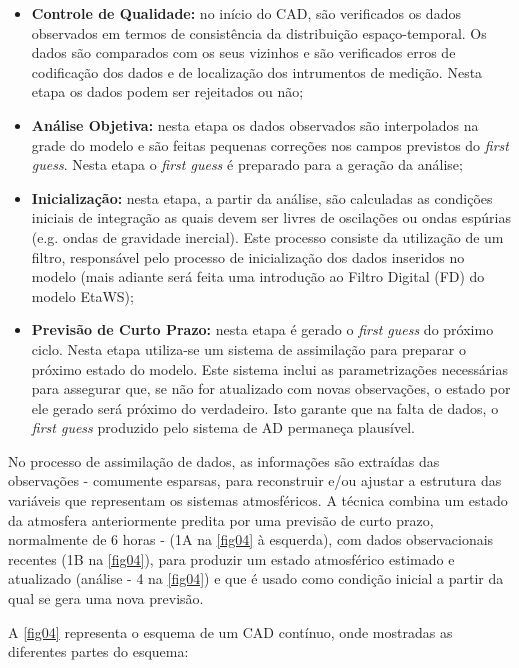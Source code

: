\begin{itemize}
\item \textbf{Controle de Qualidade:} no início do CAD, são verificados os dados observados em termos de consistência da distribuição espaço-temporal. Os dados são comparados com os seus vizinhos e são verificados erros de codificação dos dados e de localização dos intrumentos de medição. Nesta etapa os dados podem ser rejeitados ou não;
\item \textbf{Análise Objetiva:} nesta etapa os dados observados são interpolados na grade do modelo e são feitas pequenas correções nos campos previstos do \textit{first guess}. Nesta etapa o \textit{first guess} é preparado para a geração da análise;
\item \textbf{Inicialização:} nesta etapa, a partir da análise, são calculadas as condições iniciais de integração as quais devem ser livres de oscilações ou ondas espúrias (e.g. ondas de gravidade inercial). Este processo consiste da utilização de um filtro, responsável pelo processo de inicialização  dos dados inseridos no modelo (mais adiante será feita uma introdução ao Filtro Digital (FD) do modelo EtaWS);
\item \textbf{Previsão de Curto Prazo:} nesta etapa é gerado o \textit{first guess} do próximo ciclo. Nesta etapa utiliza-se um sistema de assimilação para preparar o próximo estado do modelo. Este sistema inclui as parametrizações necessárias para assegurar que, se não for atualizado com novas observações, o estado por ele gerado será próximo do verdadeiro. Isto garante que na falta de dados, o \textit{first guess} produzido pelo sistema de AD permaneça plausível.
\end{itemize}

No processo de assimilação de dados, as informações são extraídas das observações - comumente esparsas, para reconstruir e/ou ajustar a estrutura das variáveis que representam os sistemas atmosféricos. A técnica combina um estado da atmosfera anteriormente predita por uma previsão de curto prazo, normalmente de 6 horas - (1A na \autoref{fig04} à esquerda), com dados observacionais recentes (1B na \autoref{fig04}), para produzir um estado atmosférico estimado e atualizado (análise - 4 na \autoref{fig04}) e que é usado como condição inicial a partir da qual se gera uma nova previsão.

A \autoref{fig04} representa o esquema de um CAD contínuo, onde mostradas as \-di\-fe\-ren\-tes partes do esquema:



